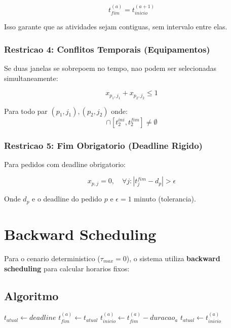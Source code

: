 \documentclass[12pt,a4paper]{article}
\begin{document}
\begin{equation}
t_{fim}^{(a)} = t_{inicio}^{(a+1)}
\end{equation}

Isso garante que as atividades sejam contiguas, sem intervalo entre elas.

\subsubsection{Restricao 4: Conflitos Temporais (Equipamentos)}

Se duas janelas se sobrepoem no tempo, nao podem ser selecionadas simultaneamente:

\begin{equation}
x_{p_1,j_1} + x_{p_2,j_2} \leq 1
\end{equation}

Para todo par $(p_1,j_1), (p_2,j_2)$ onde:
\begin{equation}
[t_1^{ini}, t_1^{fim}] \cap [t_2^{ini}, t_2^{fim}] \neq \emptyset
\end{equation}

\subsubsection{Restricao 5: Fim Obrigatorio (Deadline Rigido)}

Para pedidos com deadline obrigatorio:

\begin{equation}
x_{p,j} = 0, \quad \forall j : |t_j^{fim} - d_p| > \epsilon
\end{equation}

Onde $d_p$ e o deadline do pedido $p$ e $\epsilon = 1$ minuto (tolerancia).

\section{Backward Scheduling}

Para o cenario deterministico ($\tau_{max} = 0$), o sistema utiliza \textbf{backward scheduling} para calcular horarios fixos:

\subsection{Algoritmo}

\begin{algorithm}
\caption{Backward Scheduling}
\begin{algorithmic}[1]
\State $t_{atual} \gets deadline$
    \State $t_{fim}^{(a)} \gets t_{atual}$
    \State $t_{inicio}^{(a)} \gets t_{fim}^{(a)} - duracao_a$
    \State $t_{atual} \gets t_{inicio}^{(a)}$
\EndFor
\end{algorithmic}
\end{algorithm}
\end{document}
